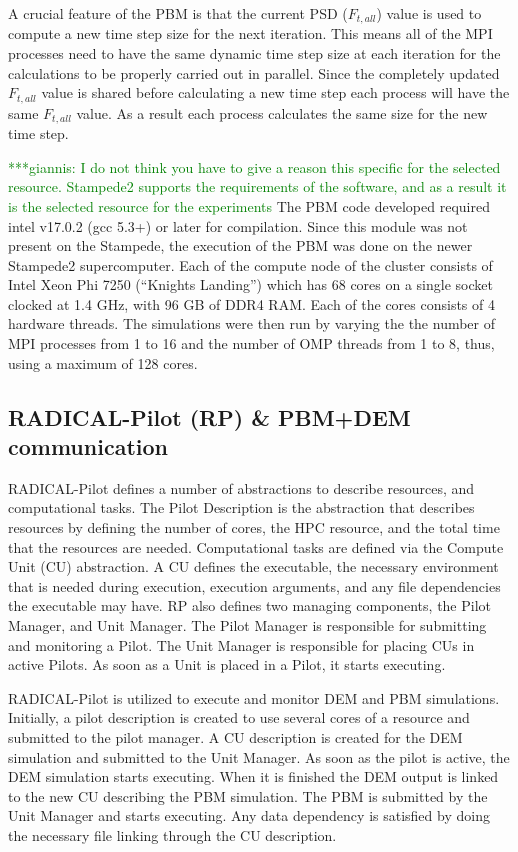 \documentclass[preprint,11pt,authoryear]{elsarticle}
\newcommand{\gpnote}[1]{{\textcolor{green} {***giannis: #1}}}
\newcommand{\gpnote}[1]{}
\begin{document}
A crucial feature of the PBM is that the current PSD ($F_{t,all}$) value is
used to compute a new time step size for the next iteration. This means all of
the MPI processes need to have the same dynamic time step size at each
iteration for the calculations to be properly carried out in parallel. Since
the completely updated $F_{t,all}$ value is shared before calculating a new
time step each process will have the same $F_{t,all}$ value. As a result each
process calculates the same size for the new time step.

\gpnote{I do not think you have to
give a reason this specific for the selected resource. Stampede2 supports the requirements of the
software, and as a result it is the selected resource for the experiments} The PBM code developed
required intel v17.0.2 (gcc 5.3+)  or later for compilation. Since this module
was not present on the Stampede, the execution of the PBM was done on the
newer Stampede2 supercomputer. Each of the compute node of the cluster
consists of Intel Xeon Phi 7250 (\textquotedblleft Knights
Landing\textquotedblright) which has 68 cores on a single socket clocked at
1.4 GHz, with 96 GB of DDR4 RAM. Each of the cores consists of 4 hardware
threads. The simulations were then run by varying the the number of MPI
processes from 1 to 16 and the number of OMP threads from 1 to 8, thus, using
a maximum of 128 cores.

\subsection{RADICAL-Pilot (RP) \& PBM+DEM communication}
\label{sec:RPandCommunications}
RADICAL-Pilot defines a number of abstractions to describe resources, and
computational tasks. The Pilot Description is the abstraction that describes
resources by defining the number of cores, the HPC resource, and the total time that 
the resources are needed. Computational tasks are defined via the Compute Unit 
(CU) abstraction. A CU defines the executable, the necessary
environment that is needed during execution, execution arguments, and any file
dependencies the executable may have. RP also defines two managing components,
the Pilot Manager, and Unit Manager. The Pilot Manager is responsible for
submitting and monitoring a Pilot. The Unit Manager is responsible for
placing CUs in active Pilots. As soon as a Unit is placed in a Pilot, it starts
executing.

RADICAL-Pilot is utilized to execute and monitor DEM and PBM simulations.
Initially, a pilot description is created to use several cores of a resource
and submitted to the pilot manager. A CU description is created for the DEM
simulation and submitted to the Unit Manager. As soon as the pilot is active,
the DEM simulation starts executing. When it is finished the DEM output is linked to 
the new CU describing the PBM
simulation. The PBM is submitted by the Unit Manager and starts executing. Any data
dependency is satisfied by doing the necessary file linking through the CU
description.
\end{document}
